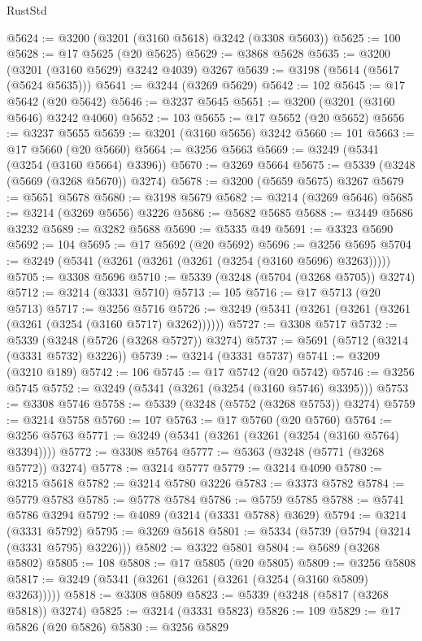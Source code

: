 \begin{lexlean}{RustStd}
\begin{coremodule}
{\begin{coremodule}
{{{{{{{{{{{{{{{{{{{{{{{{{@5624 := @3200 (@3201 (@3160 @5618) @3242 (@3308 @5603))
@5625 := 100
@5628 := @17 @5625 (@20 @5625)
@5629 := @3868 @5628
@5635 := @3200 (@3201 (@3160 @5629) @3242 @4039) @3267
@5639 := @3198 (@5614 (@5617 (@5624 @5635)))
@5641 := @3244 (@3269 @5629)
@5642 := 102
@5645 := @17 @5642 (@20 @5642)
@5646 := @3237 @5645
@5651 := @3200 (@3201 (@3160 @5646) @3242 @4060)
@5652 := 103
@5655 := @17 @5652 (@20 @5652)
@5656 := @3237 @5655
@5659 := @3201 (@3160 @5656) @3242
@5660 := 101
@5663 := @17 @5660 (@20 @5660)
@5664 := @3256 @5663
@5669 := @3249 (@5341 (@3254 (@3160 @5664) @3396))
@5670 := @3269 @5664
@5675 := @5339 (@3248 (@5669 (@3268 @5670)) @3274)
@5678 := @3200 (@5659 @5675) @3267
@5679 := @5651 @5678
@5680 := @3198 @5679
@5682 := @3214 (@3269 @5646)
@5685 := @3214 (@3269 @5656) @3226
@5686 := @5682 @5685
@5688 := @3449 @5686 @3232
@5689 := @3282 @5688
@5690 := @5335 @49
@5691 := @3323 @5690
@5692 := 104
@5695 := @17 @5692 (@20 @5692)
@5696 := @3256 @5695
@5704 := @3249 (@5341 (@3261 (@3261 (@3261 (@3254 (@3160 @5696) @3263)))))
@5705 := @3308 @5696
@5710 := @5339 (@3248 (@5704 (@3268 @5705)) @3274)
@5712 := @3214 (@3331 @5710)
@5713 := 105
@5716 := @17 @5713 (@20 @5713)
@5717 := @3256 @5716
@5726 := @3249 (@5341 (@3261 (@3261 (@3261 (@3261 (@3254 (@3160 @5717) @3262))))))
@5727 := @3308 @5717
@5732 := @5339 (@3248 (@5726 (@3268 @5727)) @3274)
@5737 := @5691 (@5712 (@3214 (@3331 @5732) @3226))
@5739 := @3214 (@3331 @5737)
@5741 := @3209 (@3210 @189)
@5742 := 106
@5745 := @17 @5742 (@20 @5742)
@5746 := @3256 @5745
@5752 := @3249 (@5341 (@3261 (@3254 (@3160 @5746) @3395)))
@5753 := @3308 @5746
@5758 := @5339 (@3248 (@5752 (@3268 @5753)) @3274)
@5759 := @3214 @5758
@5760 := 107
@5763 := @17 @5760 (@20 @5760)
@5764 := @3256 @5763
@5771 := @3249 (@5341 (@3261 (@3261 (@3254 (@3160 @5764) @3394))))
@5772 := @3308 @5764
@5777 := @5363 (@3248 (@5771 (@3268 @5772)) @3274)
@5778 := @3214 @5777
@5779 := @3214 @4090
@5780 := @3215 @5618
@5782 := @3214 @5780 @3226
@5783 := @3373 @5782
@5784 := @5779 @5783
@5785 := @5778 @5784
@5786 := @5759 @5785
@5788 := @5741 @5786 @3294
@5792 := @4089 (@3214 (@3331 @5788) @3629)
@5794 := @3214 (@3331 @5792)
@5795 := @3269 @5618
@5801 := @5334 (@5739 (@5794 (@3214 (@3331 @5795) @3226)))
@5802 := @3322 @5801
@5804 := @5689 (@3268 @5802)
@5805 := 108
@5808 := @17 @5805 (@20 @5805)
@5809 := @3256 @5808
@5817 := @3249 (@5341 (@3261 (@3261 (@3261 (@3254 (@3160 @5809) @3263)))))
@5818 := @3308 @5809
@5823 := @5339 (@3248 (@5817 (@3268 @5818)) @3274)
@5825 := @3214 (@3331 @5823)
@5826 := 109
@5829 := @17 @5826 (@20 @5826)
@5830 := @3256 @5829
}}}}}}}}}}}}}}}}}}}}}}}}}
\end{coremodule}}
\end{coremodule}
\end{lexlean}
